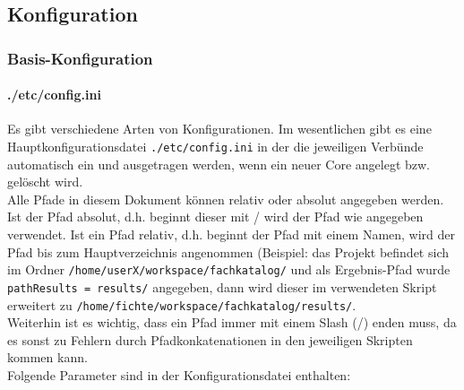 \documentclass[10pt]{article}
\begin{document}
\subsection{Konfiguration}
\subsubsection{Basis-Konfiguration}
\paragraph{./etc/config.ini}
\label{sec:para:config.ini}
Es gibt verschiedene Arten von Konfigurationen. Im wesentlichen gibt es eine Hauptkonfigurationsdatei \texttt{./etc/config.ini} in der die jeweiligen Verbünde automatisch ein und ausgetragen werden, wenn ein neuer Core angelegt bzw. gelöscht wird. \\
Alle Pfade in diesem Dokument können relativ oder absolut angegeben werden. Ist der Pfad absolut, d.h. beginnt dieser mit / wird der Pfad wie angegeben verwendet. Ist ein Pfad relativ, d.h. beginnt der Pfad mit einem Namen, wird der Pfad bis zum Hauptverzeichnis angenommen (Beispiel: das Projekt befindet sich im Ordner \texttt{/home/userX/workspace/fachkatalog/} und als Ergebnis-Pfad wurde \texttt{pathResults = results/} angegeben, dann wird dieser im verwendeten Skript erweitert zu \texttt{/home/fichte/workspace/fachkatalog/results/}. \\
Weiterhin ist es wichtig, dass ein Pfad immer mit einem Slash (/) enden muss, da es sonst zu Fehlern durch Pfadkonkatenationen in den jeweiligen Skripten kommen kann. \\
Folgende Parameter sind in der Konfigurationsdatei enthalten:
\end{document}
